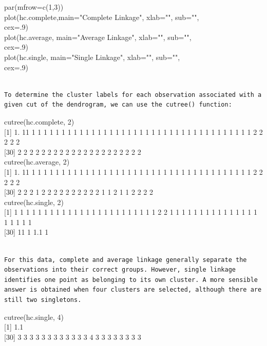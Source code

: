 \documentclass[10pt]{article}
\begin{document}
\begin{displayquote}
par(mfrow=c(1,3))\\
plot(hc.complete,main="Complete Linkage", xlab="", sub="",\\
cex=.9)\\
plot(hc.average, main="Average Linkage", xlab="", sub="",\\
cex=.9)\\
plot(hc.single, main="Single Linkage", xlab="", sub="",\\
cex=.9)
\end{displayquote}

\begin{verbatim}

To determine the cluster labels for each observation associated with a given cut of the dendrogram, we can use the cutree() function:
\end{verbatim}

\begin{displayquote}
cutree(hc.complete, 2)\\[0pt]
[1] 1. 11 1 1 1 1 1 1 1 1 1 1 1 1 1 1 1 1 1 1 1 1 1 1 1 1 1 1 1 1 1 1 1 1 1 1 1 1 1 2 2 2 2 2\\[0pt]
[30] 2 2 2 2 2 2 2 2 2 2 2 2 2 2 2 2 2 2 2 2 2\\
cutree(hc.average, 2)\\[0pt]
[1] 1. 11 1 1 1 1 1 1 1 1 1 1 1 1 1 1 1 1 1 1 1 1 1 1 1 1 1 1 1 1 1 1 1 1 1 1 1 1 1 2 2 2 2 2\\[0pt]
[30] 2 2 2 1 2 2 2 2 2 2 2 2 2 2 1 1 2 1 1 2 2 2 2\\
cutree(hc.single, 2)\\[0pt]
[1] 1 1 1 1 1 1 1 1 1 1 1 1 1 1 1 1 1 1 1 1 1 1 1 1 2 2 1 1 1 1 1 1 1 1 1 1 1 1 1 1 1 1 1 1 1 1\\[0pt]
[30] 11 1 1.1 1
\end{displayquote}

\begin{verbatim}

For this data, complete and average linkage generally separate the observations into their correct groups. However, single linkage identifies one point as belonging to its own cluster. A more sensible answer is obtained when four clusters are selected, although there are still two singletons.
\end{verbatim}

\begin{displayquote}
cutree(hc.single, 4)\\[0pt]
[1] 1.1\\[0pt]
[30] 3 3 3 3 3 3 3 3 3 3 3 3 4 3 3 3 3 3 3 3 3
\end{displayquote}
\end{document}
